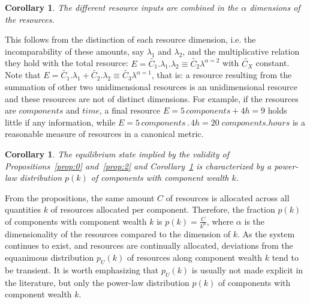\documentclass[a4paper, 11pt]{article} %
\newtheorem{corollary}[theorem2]{Corollary}
\begin{document}
\begin{corollary}\label{prop:1}
	The different resource inputs are combined in the $\alpha$ dimensions of the resources.
\end{corollary}



%

This follows from the distinction of each resource dimension,
i.e. the incomparability of these amounts, say $\lambda_1$ and $\lambda_2$, and the multiplicative relation they hold with the total resource: $E=\widetilde{C_1} . \lambda_1 . \lambda_2 \equiv \widetilde{C_2}\lambda^{\alpha=2}$
with $\widetilde{C_X}$ constant.
Note that $E=\widetilde{C_1} . \lambda_1 + \widetilde{C_2}.\lambda_2 \equiv \widetilde{C_3}\lambda^{\alpha=1}$, that is: a resource resulting from the summation of other two unidimensional resources is an unidimensional resource and these resources are not of distinct dimensions. For example, if the resources are $components$ and $time$,
a final resource $E=5\, components + 4h=9$
holds little if any information, while
$E= 5\, components \, . \, 4 h= 20\; components . hours$ is
a reasonable measure of resources in a canonical metric.

\begin{corollary}\label{prop:3}
	The equilibrium state implied by the validity of Propositions~\ref{prop:0} and~\ref{prop:2} and Corollary~\ref{prop:1} is characterized by a power-law distribution $p(k)$ of components with component wealth $k$.
\end{corollary}

From the propositions, the same amount $C$ of resources is allocated
across all quantities $k$ of resources allocated per component.
Therefore, the fraction $p(k)$ of components with component wealth $k$ is
$p(k)=\frac{C}{k^\alpha}$, where $\alpha$ is
the dimensionality of the resources compared to the dimension of $k$.
As the system continues to exist,
and resources are continually allocated, deviations from the equanimous distribution $p_U(k)$ of resources along component wealth $k$  tend to be transient. It is worth emphasizing that $p_U(k)$ is usually not made explicit in the literature, but only
 the power-law distribution $p(k)$ of components
with component wealth $k$.
\end{document}
